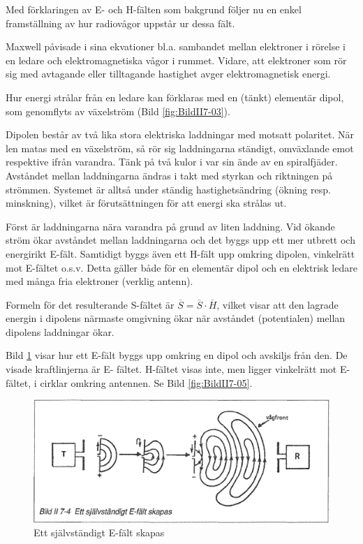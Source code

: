 Med förklaringen av E- och H-fälten som bakgrund följer nu en enkel
framställning av hur radiovågor uppstår ur dessa fält.

Maxwell påvisade i sina ekvationer bl.a. sambandet mellan elektroner
i rörelse i en ledare och elektromagnetiska vågor i rummet. Vidare,
att elektroner som rör sig med avtagande eller tilltagande hastighet
avger elektromagnetisk energi.

Hur energi strålar från en ledare kan förklaras med en (tänkt)
elementär dipol, som genomflyts av växelström (Bild \ref{fig:BildII7-03}).

Dipolen består av två lika stora elektriska laddningar med motsatt
polaritet. När len matas med en växelström, så rör sig laddningarna
ständigt, omväxlande emot respektive ifrån varandra. Tänk på två kulor
i var sin ände av en spiralfjäder. Avståndet mellan laddningarna
ändras i takt med styrkan och riktningen på strömmen. Systemet är
alltså under ständig hastighetsändring (ökning resp. minskning),
vilket är förutsättningen för att energi ska strålas ut.

Först är laddningarna nära varandra på grund av liten laddning. Vid
ökande ström ökar avståndet mellan laddningarna och det byggs upp ett
mer utbrett och energirikt E-fält. Samtidigt byggs även ett H-fält upp
omkring dipolen, vinkelrätt mot E-fältet o.s.v. Detta gäller både för
en elementär dipol och en elektrisk ledare med många fria elektroner
(verklig antenn).

Formeln för det resulterande S-fältet är \(\overline{S} =
\overline{S}\cdot\overline{H}\), vilket visar att den lagrade energin
i dipolens närmaste omgivning ökar när avståndet (potentialen) mellan
dipolens laddningar ökar.

Bild \ref{fig:BildII7-04} visar hur ett E-fält byggs upp omkring en dipol och
avskiljs från den. De visade kraftlinjerna är E- fältet. H-fältet
visas inte, men ligger vinkelrätt mot E-fältet, i cirklar omkring
antennen. Se Bild \ref{fig:BildII7-05}.

\begin{figure}
\includegraphics[width=\textwidth]{images/bild_2_7-04}
\caption{Ett självständigt E-fält skapas}
\label{fig:BildII7-04}
\end{figure}

